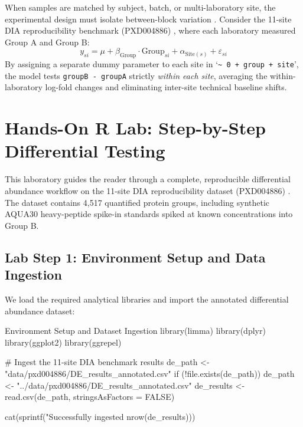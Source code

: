 \documentclass[11pt,twoside,openright]{book}
\begin{document}
When samples are matched by subject, batch, or multi-laboratory site, the experimental design must isolate between-block variation \cite{johnson2007adjusting, leek2010tackling}. Consider the 11-site DIA reproducibility benchmark (PXD004886) \cite{bruderer2017optimization}, where each laboratory measured Group A and Group B:
\begin{equation}
y_{si} = \mu + \beta_{\text{Group}} \cdot \text{Group}_{si} + \alpha_{\text{Site}(s)} + \varepsilon_{si}
\end{equation}
By assigning a separate dummy parameter to each site in `\texttt{\~{} 0 + group + site}', the model tests \texttt{groupB - groupA} strictly \textit{within each site}, averaging the within-laboratory log-fold changes and eliminating inter-site technical baseline shifts.

\section{Hands-On R Lab: Step-by-Step Differential Testing}

This laboratory guides the reader through a complete, reproducible differential abundance workflow on the 11-site DIA reproducibility dataset (PXD004886) \cite{bruderer2017optimization}. The dataset contains 4,517 quantified protein groups, including synthetic AQUA30 heavy-peptide spike-in standards spiked at known concentrations into Group B.

\subsection{Lab Step 1: Environment Setup and Data Ingestion}

We load the required analytical libraries and import the annotated differential abundance dataset:

\begin{rchunk}{Environment Setup and Dataset Ingestion}
library(limma)
library(dplyr)
library(ggplot2)
library(ggrepel)

# Ingest the 11-site DIA benchmark results
de_path <- "data/pxd004886/DE_results_annotated.csv"
if (!file.exists(de_path)) {
  de_path <- "../data/pxd004886/DE_results_annotated.csv"
}
de_results <- read.csv(de_path, stringsAsFactors = FALSE)

cat(sprintf("Successfully ingested %
            nrow(de_results)))
\end{rchunk}
\end{document}
